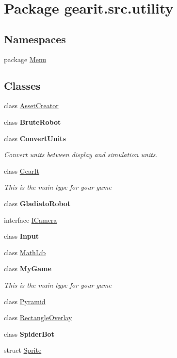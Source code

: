 \hypertarget{namespacegearit_1_1src_1_1utility}{\section{Package gearit.\+src.\+utility}
\label{namespacegearit_1_1src_1_1utility}
}
\subsection*{Namespaces}
\begin{DoxyCompactItemize}
\item 
package \hyperlink{namespacegearit_1_1src_1_1utility_1_1_menu}{Menu}
\end{DoxyCompactItemize}
\subsection*{Classes}
\begin{DoxyCompactItemize}
\item 
class \hyperlink{classgearit_1_1src_1_1utility_1_1_asset_creator}{Asset\+Creator}
\item 
class {\bfseries Brute\+Robot}
\item 
class {\bfseries Convert\+Units}
\begin{DoxyCompactList}\small\item\em Convert units between display and simulation units. \end{DoxyCompactList}\item 
class \hyperlink{classgearit_1_1src_1_1utility_1_1_gear_it}{Gear\+It}
\begin{DoxyCompactList}\small\item\em This is the main type for your game \end{DoxyCompactList}\item 
class {\bfseries Gladiato\+Robot}
\item 
interface \hyperlink{interfacegearit_1_1src_1_1utility_1_1_i_camera}{I\+Camera}
\item 
class {\bfseries Input}
\item 
class \hyperlink{classgearit_1_1src_1_1utility_1_1_math_lib}{Math\+Lib}
\item 
class {\bfseries My\+Game}
\begin{DoxyCompactList}\small\item\em This is the main type for your game \end{DoxyCompactList}\item 
class \hyperlink{classgearit_1_1src_1_1utility_1_1_pyramid}{Pyramid}
\item 
class \hyperlink{classgearit_1_1src_1_1utility_1_1_rectangle_overlay}{Rectangle\+Overlay}
\item 
class {\bfseries Spider\+Bot}
\item 
struct \hyperlink{structgearit_1_1src_1_1utility_1_1_sprite}{Sprite}
\end{DoxyCompactItemize}
